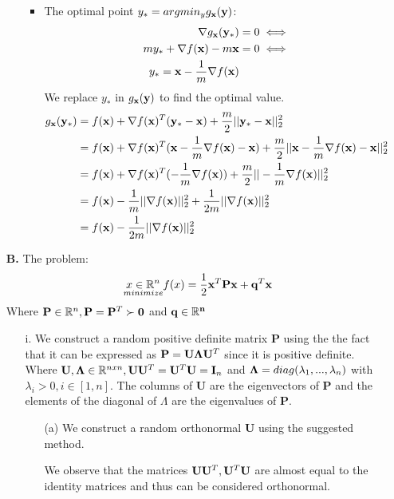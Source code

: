 \documentclass[12pt]{article}
\begin{document}
\begin{enumerate}
\begin{enumerate}
\begin{itemize}
			\item
			The optimal point $y_{*}=argmin_y g_{\bf x}({\bf y})$:
			\begin{equation}
				\begin{split}
					\nabla g_{\bf x}({\bf y_{*}}) &= 0 \iff\\
					my_{*}+\nabla f({\bf x})-m{\bf x} &= 0 \iff\\
					y_{*}={\bf x}-\frac{1}{m}\nabla f({\bf x})
				\end{split}
			\end{equation}
			We replace $y_{*}$ in $g_{\bf x}({\bf y})$ to find the optimal value.
			\begin{equation}
				\begin{split}
					g_{\bf x}({\bf y_{*}})&= f({\bf x})+\nabla f({\bf x})^T({\bf y_{*}}-{\bf x})+\frac{m}{2}||{\bf y_{*}}-{\bf x}||_2^2\\
					&= f({\bf x})+\nabla f({\bf x})^T({\bf x}-\frac{1}{m}\nabla f({\bf x})-{\bf x})+\frac{m}{2}||{\bf x}-\frac{1}{m}\nabla f({\bf x})-{\bf x}||_2^2\\
					&= f({\bf x})+\nabla f({\bf x})^T(-\frac{1}{m}\nabla f({\bf x}))+\frac{m}{2}||-\frac{1}{m}\nabla f({\bf x})||_2^2\\
					&=f({\bf x})-\frac{1}{m}||\nabla f({\bf x})||_2^2+\frac{1}{2m}||\nabla f({\bf x})||_2^2\\
					&=f({\bf x})-\frac{1}{2m}||\nabla f({\bf x})||_2^2
				\end{split}
			\end{equation}
		\end{itemize}
		\end{enumerate}
		\item[{\bf B.}]The problem:
		\begin{equation}
			\underset{minimize}{x\in\mathbb{R}^n}f(x)=\frac{1}{2}{\bf x}^T{\bf P}{\bf x}+{\bf q}^T{\bf x}
		\end{equation}
		Where ${\bf P}\in \mathbb{R}^n, {\bf P}={\bf P}^T \succ{\bf 0}$ and ${\bf q\in \mathbb{R}^n}$
		\begin{enumerate}
			\item[i.]
			We construct a random positive definite matrix {\bf P} using the the fact that it can be expressed as ${\bf P}={\bf U\Lambda}{\bf U}^T$ since it is positive definite.\\
			Where ${\bf U,\Lambda}\in \mathbb{R}^{nxn},{\bf U}{\bf U}^T={\bf U}^T{\bf U}={\bf I}_n$ and ${\bf \Lambda}=diag(\lambda_1,...,\lambda_n)$ with $\lambda_i>0,i\in[1,n]$. The columns of {\bf U} are the eigenvectors of {\bf P} and the elements of the diagonal of {\bf $\Lambda$} are the eigenvalues of {\bf P}.
			\newpage
			\begin{enumerate}
				\item[(a)]
				We construct a random orthonormal {\bf U} using the suggested method.
				
				We observe that the matrices ${\bf U}{\bf U}^T,{\bf U}^T{\bf U}$ are almost equal to the identity matrices and thus can be considered orthonormal.
			

\end{enumerate}
\end{enumerate}
\end{enumerate}
\end{document}
